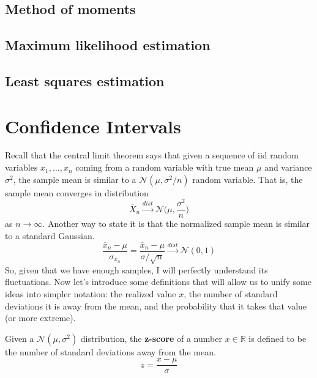 \documentclass{article}
\begin{document}
  \subsection{Method of moments}

  \subsection{Maximum likelihood estimation}

  \subsection{Least squares estimation}

\section{Confidence Intervals}

    Recall that the central limit theorem says that given a sequence of iid random variables $x_1, \ldots, x_n$ coming from a random variable with true mean $\mu$ and variance $\sigma^2$, the sample mean is similar to a $\mathcal{N}(\mu, \sigma^2 / n)$ random variable. That is, the sample mean converges in distribution 
    \begin{equation}
      \overline{X}_n \xrightarrow{dist} \mathcal{N} \Big( \mu, \frac{\sigma^2}{n} \Big)
    \end{equation}
    as $n \rightarrow \infty$. Another way to state it is that the normalized sample mean is similar to a standard Gaussian. 
    \begin{equation}
      \frac{\overline{x}_n - \mu}{\sigma_{\overline{x}_n}} = \frac{\overline{x}_n - \mu}{\sigma / \sqrt{n}} \xrightarrow{dist} \mathcal{N}(0, 1)
    \end{equation}
    So, given that we have enough samples, I will perfectly understand its fluctuations. Now let's introduce some definitions that will allow us to unify some ideas into simpler notation: the realized value $x$, the number of standard deviations it is away from the mean, and the probability that it takes that value (or more extreme). 

    \begin{definition}[z-score]
      Given a $\mathcal{N}(\mu, \sigma^2)$ distribution, the \textbf{z-score} of a number $x \in \mathbb{R}$ is defined to be the number of standard deviations away from the mean. 
      \begin{equation}
        z = \frac{x - \mu}{\sigma}
      \end{equation}
    \end{definition}
\end{document}
